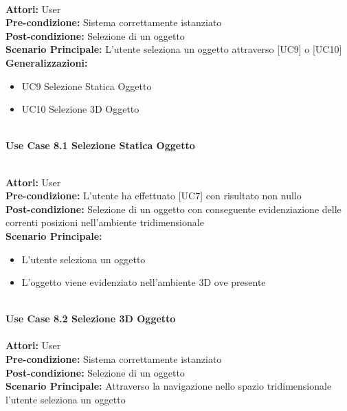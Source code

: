 \vspace{0.5cm}

\large\textbf{} \\
\textbf{Attori:} User\\
\textbf{Pre-condizione:} Sistema correttamente istanziato \\
\textbf{Post-condizione: } Selezione di un oggetto\\
\textbf{Scenario Principale:}  
 L'utente seleziona un oggetto attraverso [UC9] o [UC10]
\textbf{Generalizzazioni:} 
\begin{itemize}
    \item UC9 Selezione Statica Oggetto
    \item UC10 Selezione 3D Oggetto
\end{itemize}

\Large\textbf{}\\
\Large\textbf{Use Case 8.1 Selezione Statica Oggetto} \\

\vspace{0.5cm}

\large\textbf{} \\
\textbf{Attori:} User\\
\textbf{Pre-condizione:} L'utente ha effettuato [UC7] con risultato non nullo \\
\textbf{Post-condizione: }  Selezione di un oggetto con conseguente evidenziazione delle correnti posizioni nell'ambiente tridimensionale\\
\textbf{Scenario Principale:}
\begin{itemize}
    \item L'utente seleziona un oggetto
    \item L'oggetto viene evidenziato nell'ambiente 3D ove presente
\end{itemize}

\vspace{0.5cm}

\Large\textbf{}\\
\Large\textbf{Use Case 8.2 Selezione 3D Oggetto} \\

\large\textbf{} \\
\textbf{Attori:} User\\
\textbf{Pre-condizione:} Sistema correttamente istanziato \\
\textbf{Post-condizione: } Selezione di un oggetto\\
\textbf{Scenario Principale:}
Attraverso la navigazione nello spazio tridimensionale l'utente seleziona un oggetto

